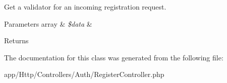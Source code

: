 Get a validator for an incoming registration request.


\begin{DoxyParams}[1]{Parameters}
array & {\em \$data} & \\
\hline
\end{DoxyParams}
\begin{DoxyReturn}{Returns}

\end{DoxyReturn}


The documentation for this class was generated from the following file\+:\begin{DoxyCompactItemize}
\item 
app/\+Http/\+Controllers/\+Auth/Register\+Controller.\+php\end{DoxyCompactItemize}
